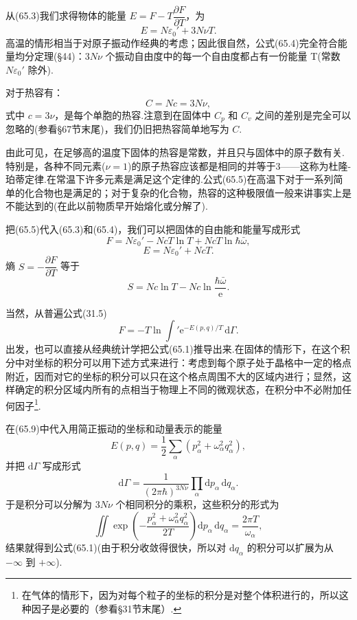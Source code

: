 从(65.3)我们求得物体的能量 $E=F-T\dfrac{\partial F}{\partial T}$，为
\begin{equation}
  E=N\varepsilon_0'+3N\nu T.
\end{equation}
高温的情形相当于对原子振动作经典的考虑；因此很自然，公式(65.4)完全符合能量均分定理(§44)：$3N\nu$ 个振动自由度中的每一个自由度都占有一份能量 T(常数 $N\varepsilon_0'$ 除外).

对于热容有：
\begin{equation}
  C=Nc=3N\nu,
\end{equation}
式中 $c=3\nu$，是每个单胞的热容.注意到在固体中 $C_p$ 和 $C_v$ 之间的差别是完全可以忽略的(参看§67节末尾)，我们仍旧把热容简单地写为 $C$.

由此可见，在足够高的温度下固体的热容是常数，并且只与固体中的原子数有关.特别是，各种不同元素($\nu=1$)的原子热容应该都是相同的并等于3——这称为杜隆-珀蒂定律.在常温下许多元素是满足这个定律的.公式(65.5)在高温下对于一系列简单的化合物也是满足的；对于复杂的化合物，热容的这种极限值一般来讲事实上是不能达到的(在此以前物质早开始熔化或分解了).

把(65.5)代入(65.3)和(65.4)，我们可以把固体的自由能和能量写成形式
\begin{equation}
  F=N\varepsilon_0'-NcT\ln T+NcT\ln\hbar\bar{\omega},
\end{equation}
\begin{equation}
  E=N\varepsilon_0'+NcT.
\end{equation}
熵 $S=-\dfrac{\partial F}{\partial T}$ 等于
\begin{equation}
  S=Nc\ln T-Nc\ln\frac{\hbar\bar{\omega}}{\mathrm{e}}.
\end{equation}

当然，从普遍公式(31.5)
\begin{equation}
  F=-T\ln\int'\mathrm{e}^{-E(p,q)/T}\,\mathrm{d}\varGamma.
\end{equation}
出发，也可以直接从经典统计学把公式(65.1)推导出来.在固体的情形下，在这个积分中对坐标的积分可以用下述方式来进行：考虑到每个原子处于晶格中一定的格点附近，因而对它的坐标的积分可以只在这个格点周围不大的区域内进行；显然，这样确定的积分区域内所有的点相当于物理上不同的微观状态，在积分中不必附加任何因子\footnote{在气体的情形下，因为对每个粒子的坐标的积分是对整个体积进行的，所以这种因子是必要的（参看§31节末尾）.}.

在(65.9)中代入用简正振动的坐标和动量表示的能量
\begin{equation}
  E(p,q)=\frac{1}{2}\sum_\alpha\left(p_\alpha^2+\omega_\alpha^2q_\alpha^2\right),
\end{equation}
并把 $\mathrm{d}\varGamma$ 写成形式
\begin{equation*}
  \mathrm{d}\varGamma=\frac{1}{(2\pi\hbar)^{3N\nu}}\prod_\alpha\mathrm{d}p_\alpha\,\mathrm{d}q_\alpha.
\end{equation*}
于是积分可以分解为 $3N\nu$ 个相同积分的乘积，这些积分的形式为
\begin{equation*}
  \iint\exp\left(-\frac{p_\alpha^2+\omega_\alpha^2q_\alpha^2}{2T}\right)\mathrm{d}p_\alpha\,\mathrm{d}q_\alpha=\frac{2\pi T}{\omega_\alpha},
\end{equation*}
结果就得到公式(65.1)(由于积分收敛得很快，所以对 $\mathrm{d}q_\alpha$ 的积分可以扩展为从 $-\infty$ 到 $+\infty$).

